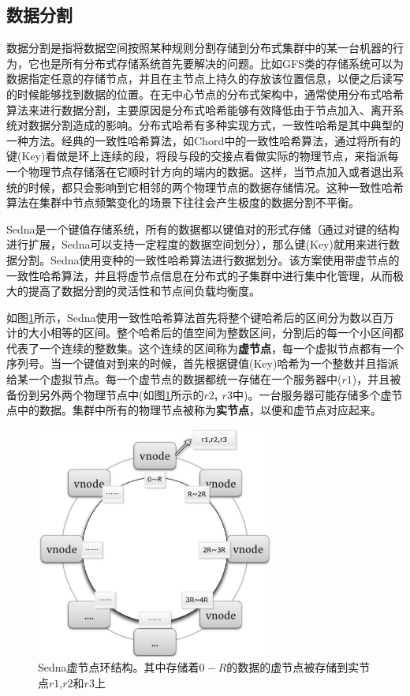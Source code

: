 \subsection{数据分割}
数据分割是指将数据空间按照某种规则分割存储到分布式集群中的某一台机器的行为，它也是所有分布式存储系统首先要解决的问题。比如GFS类的存储系统可以为数据指定任意的存储节点，并且在主节点上持久的存放该位置信息，以便之后读写的时候能够找到数据的位置。在无中心节点的分布式架构中，通常使用分布式哈希算法来进行数据分割，主要原因是分布式哈希能够有效降低由于节点加入、离开系统对数据分割造成的影响。分布式哈希有多种实现方式，一致性哈希是其中典型的一种方法。经典的一致性哈希算法，如Chord\cite{stoica2001chord}中的一致性哈希算法，通过将所有的键(Key)看做是环上连续的段，将段与段的交接点看做实际的物理节点，来指派每一个物理节点存储落在它顺时针方向的端内的数据。这样，当节点加入或者退出系统的时候，都只会影响到它相邻的两个物理节点的数据存储情况。这种一致性哈希算法在集群中节点频繁变化的场景下往往会产生极度的数据分割不平衡。

Sedna是一个键值存储系统，所有的数据都以键值对的形式存储（通过对键的结构进行扩展，Sedna可以支持一定程度的数据空间划分），那么键(Key)就用来进行数据分割。Sedna使用变种的一致性哈希算法进行数据划分。该方案使用带虚节点的一致性哈希算法，并且将虚节点信息在分布式的子集群中进行集中化管理，从而极大的提高了数据分割的灵活性和节点间负载均衡度。

如图\ref{fig:vnode}所示，Sedna使用一致性哈希算法首先将整个键哈希后的区间分为数以百万计的大小相等的区间。整个哈希后的值空间为整数区间，分割后的每一个小区间都代表了一个连续的整数集。这个连续的区间称为\textbf{虚节点}，每一个虚拟节点都有一个序列号。当一个键值对到来的时候，首先根据键值(Key)哈希为一个整数并且指派给某一个虚拟节点。每一个虚节点的数据都统一存储在一个服务器中(\textbf{$r1$})，并且被备份到另外两个物理节点中(如图\ref{fig:vnode}所示的\textbf{$r2$, $r3$}中)。一台服务器可能存储多个虚节点中的数据。集群中所有的物理节点被称为\textbf{实节点}，以便和虚节点对应起来。

\begin{figure}[h!]
  \centering
  \includegraphics[height=3in]{../figures/vnode.pdf}
  \caption{Sedna虚节点环结构。其中存储着$0-R$的数据的虚节点被存储到实节点$r1$,$r2$和$r3$上}
  \label{fig:vnode}
\end{figure}

